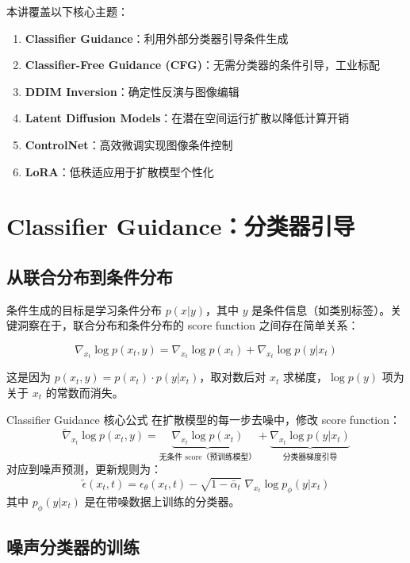 \documentclass[a4paper]{article}
\begin{document}
本讲覆盖以下核心主题：
\begin{enumerate}
    \item \textbf{Classifier Guidance}：利用外部分类器引导条件生成
    \item \textbf{Classifier-Free Guidance (CFG)}：无需分类器的条件引导，工业标配
    \item \textbf{DDIM Inversion}：确定性反演与图像编辑
    \item \textbf{Latent Diffusion Models}：在潜在空间运行扩散以降低计算开销
    \item \textbf{ControlNet}：高效微调实现图像条件控制
    \item \textbf{LoRA}：低秩适应用于扩散模型个性化
\end{enumerate}

\newpage
\section{Classifier Guidance：分类器引导}

\subsection{从联合分布到条件分布}

条件生成的目标是学习条件分布 $p(x|y)$，其中 $y$ 是条件信息（如类别标签）。关键洞察在于，联合分布和条件分布的 score function 之间存在简单关系：

$$
\nabla_{x_t}\log p(x_t, y) = \nabla_{x_t}\log p(x_t) + \nabla_{x_t}\log p(y|x_t)
$$

这是因为 $p(x_t, y) = p(x_t)\cdot p(y|x_t)$，取对数后对 $x_t$ 求梯度，$\log p(y)$ 项为关于 $x_t$ 的常数而消失。

\begin{importantbox}{Classifier Guidance 核心公式}
在扩散模型的每一步去噪中，修改 score function：
$$
\tilde{\nabla}_{x_t}\log p(x_t, y) = \underbrace{\nabla_{x_t}\log p(x_t)}_{\text{无条件 score（预训练模型）}} + \underbrace{\nabla_{x_t}\log p(y|x_t)}_{\text{分类器梯度引导}}
$$
对应到噪声预测，更新规则为：
$$
\tilde{\epsilon}(x_t, t) = \epsilon_\theta(x_t, t) - \sqrt{1-\bar\alpha_t}\;\nabla_{x_t}\log p_\phi(y|x_t)
$$
其中 $p_\phi(y|x_t)$ 是在带噪数据上训练的分类器。
\end{importantbox}

\subsection{噪声分类器的训练}
\end{document}

